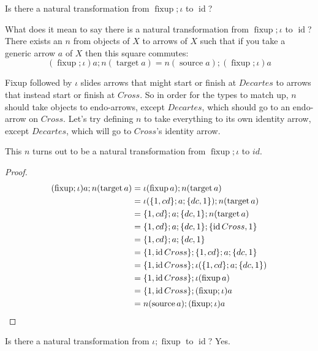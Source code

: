 \documentclass{proc-l}
\theoremstyle{definition}
\theoremstyle{remark}
\numberwithin{equation}{section}
\begin{document}
Is there a natural transformation from \(\operatorname{fixup}; \iota\) to \(\operatorname{id}\)?

What does it mean to say there is a natural transformation from \(\operatorname{fixup}; \iota\) to \(\operatorname{id}\)?
There exists an \(n\) from objects of \(X\) to arrows of \(X\)
such that if you take a generic arrow \(a\) of \(X\)
then this square commutes:
\[
(\operatorname{fixup}; \iota) a; n (\operatorname{target} a) = n (\operatorname{source} a); (\operatorname{fixup}; \iota) a
\]

Fixup followed by \(\iota\) slides arrows that might start or finish at \(Decartes\) to arrows that instead start or finish at \(Cross\).
So in order for the types to match up, \(n\) should take objects to endo-arrows, except \(Decartes\), which should go to an endo-arrow on \(Cross\).
Let's try defining \(n\) to take everything to its own identity arrow,
except \(Decartes\), which will go to \(Cross\)'s identity arrow. 

This \(n\) turns out to be a natural transformation from \(\operatorname{fixup}; \iota\) to \(id\).

\begin{proof}
\begin{align*}
(\operatorname{fixup}; \iota) a; n (\operatorname{target} a) & = \iota (\operatorname{fixup} a); n (\operatorname{target} a) \\
& = \iota (\{ 1, cd \}; a; \{ dc, 1 \}); n (\operatorname{target} a) \\      
& = \{ 1, cd \}; a; \{ dc, 1 \}; n (\operatorname{target} a) \\
& = \{ 1, cd \}; a; \{ dc, 1 \}; \{ \operatorname{id} Cross, 1 \} \\
& = \{ 1, cd \}; a; \{ dc, 1 \} \\
& = \{ 1, \operatorname{id} Cross \}; \{ 1, cd \}; a; \{ dc, 1 \} \\
& = \{ 1, \operatorname{id} Cross \}; \iota (\{ 1, cd \}; a; \{ dc, 1 \}) \\
& = \{ 1, \operatorname{id} Cross \}; \iota (\operatorname{fixup} a) \\
& = \{ 1, \operatorname{id} Cross \}; (\operatorname{fixup}; \iota) a \\   
& = n (\operatorname{source} a); (\operatorname{fixup}; \iota) a   \qedhere
\end{align*}
\end{proof}

Is there a natural transformation from \(\iota; \operatorname{fixup}\) to \(\operatorname{id}\)? Yes.
\end{document}
